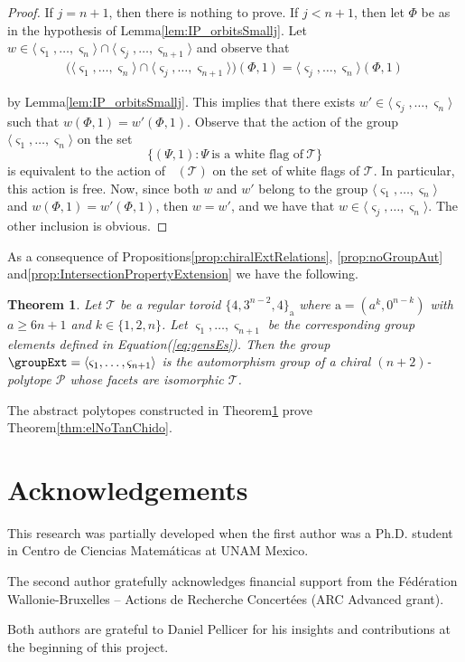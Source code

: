 \documentclass[final]{amsart}
\theoremstyle{plain}
\newtheorem{thm}{Theorem}[section]
\theoremstyle{definition}
\theoremstyle{remark}
\numberwithin{equation}{section}
\renewcommand{\{}{\lbrace}
\renewcommand{\}}{\rbrace}
\newcommand{\cP}{\mathcal{P}}
\newcommand{\cT}{\mathcal{T}}
\newcommand{\cyvec}[1]{{\mathrm{#1}}}
\newcommand{\va}{\cyvec{a}}
\DeclareMathOperator{\mon}{Mon}
\DeclareMathOperator{\monp}{\mon^{+}}
\newcommand{\typetor}[1][n-2]{\{4,3^{#1},4\}}
\newcommand{\es}{\varsigma}
\begin{document}
\begin{proof}
  If $j = n+1$, then there is nothing to prove. If $j < n+1$, then let $\Phi$ be as in the hypothesis of Lemma\nobreakspace \ref {lem:IP_orbitsSmallj}. Let $w \in \langle \es_{1}, \dots, \es_{n} \rangle  \cap \langle \es_{j}, \dots, \es_{n+1} \rangle$ and observe that
\begin{align*}
    \big(\langle \es_{1}, \dots, \es_{n} \rangle  \cap \langle \es_{j}, \dots, \es_{n+1} \rangle \big) (\Phi,1) = \langle \es_{j}, \dots, \es_{n} \rangle(\Phi, 1)
  \end{align*}
  
 by Lemma\nobreakspace \ref {lem:IP_orbitsSmallj}. This implies that there exists $w' \in \langle \es_{j}, \dots, \es_{n} \rangle$ such that $w(\Phi,1) = w'(\Phi,1)$. Observe that the action of the group $\langle \es_{1}, \dots, \es_{n} \rangle$ on the set \[\{(\Psi,1) : \Psi\ \text{is a white flag of}\ \cT\}\] is equivalent to the action of $\monp(\cT)$ on the set of white flags of $\cT$. In particular, this action is free. Now, since both $w$ and $w'$ belong to the group $\langle \es_{1}, \dots, \es_{n} \rangle$ and $w(\Phi,1) = w'(\Phi,1)$, then $w=w'$, and we have that $w \in \langle \es_{j}, \dots, \es_{n}\rangle$.
  The other inclusion is obvious.
\end{proof}



As a consequence of  Propositions\nobreakspace \ref {prop:chiralExtRelations},  \ref {prop:noGroupAut} and\nobreakspace  \ref {prop:IntersectionPropertyExtension} we have the following.



\begin{thm}\label{thm:elChido}
Let $\cT$ be a regular toroid $\typetor_{\va}$ where $\va = (a^{k}, 0^{n-k})$ with $a \geq 6n +1$ and $k \in \{1,2,n\}$.
Let $\es_{1}, \dots, \es_{n+1}$ be the corresponding group elements defined in Equation\nobreakspace \textup {(\ref {eq:gensEs})}. Then the group $\groupExt = \langle \es_{1}, \dots, \es_{n+1} \rangle$ is the automorphism group of a chiral $(n+2)$-polytope $\cP$ whose facets are isomorphic $\cT$.
\end{thm}

The abstract polytopes constructed in Theorem\nobreakspace \ref {thm:elChido} prove Theorem\nobreakspace \ref {thm:elNoTanChido}.
 
\section*{Acknowledgements}
This research was partially developed when the first author was a Ph.D. student in Centro de Ciencias Matemáticas at UNAM Mexico. 

The second author gratefully acknowledges financial support from the F\'ed\'eration Wallonie-Bruxelles -- Actions de Recherche Concert\'ees (ARC Advanced grant).

Both authors are grateful to Daniel Pellicer for his insights and contributions at the beginning of this project.

\printbibliography 
\end{document}
